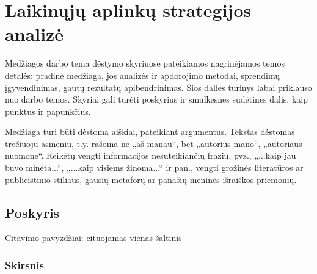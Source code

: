 \documentclass{VUMIFPSkursinis}
\begin{document}



\section{Laikinųjų aplinkų strategijos analizė}
Medžiagos darbo tema dėstymo skyriuose pateikiamos nagrinėjamos temos detalės:
pradinė medžiaga, jos analizės ir apdorojimo metodai, sprendimų įgyvendinimas,
gautų rezultatų apibendrinimas. Šios dalies turinys labai priklauso nuo darbo
temos. Skyriai gali turėti poskyrius ir smulkesnes sudėtines dalis, kaip
punktus ir papunkčius.

Medžiaga turi būti dėstoma aiškiai, pateikiant argumentus. Tekstas dėstomas
trečiuoju asmeniu, t.y. rašoma ne „aš manau“, bet „autorius mano“, „autoriaus
nuomone“. Reikėtų vengti informacijos nesuteikiančių frazių, pvz., „...kaip jau
buvo minėta...“, „...kaip visiems žinoma...“ ir pan., vengti grožinės literatūros
ar publicistinio stiliaus, gausių metaforų ar panašių meninės išraiškos
priemonių.

\subsection{Poskyris}
Citavimo pavyzdžiai: cituojamas vienas šaltinis

\subsubsection{Skirsnis}
\end{document}
